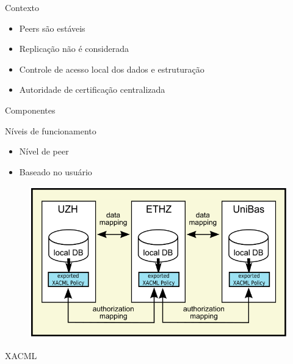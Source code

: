 \documentclass{beamer}
\begin{document}
\begin{frame}{Contexto}
  \begin{itemize}
   \item Peers são estáveis
   \item Replicação não é considerada
   \item Controle de acesso local dos dados e estruturação
   \item Autoridade de certificação centralizada
  \end{itemize}

\end{frame}


\begin{frame}{Componentes}
 \begin{block}{Níveis de funcionamento}
  \begin{itemize}
   \item Nível de peer
   \item Baseado no usuário
  \end{itemize}
 \end{block}
 \begin{figure}[H]
    \includegraphics[scale=0.3]{demap_fig1.png}
 \end{figure}

\end{frame}

\begin{frame}[plain]{XACML}

\end{frame}
\end{document}
